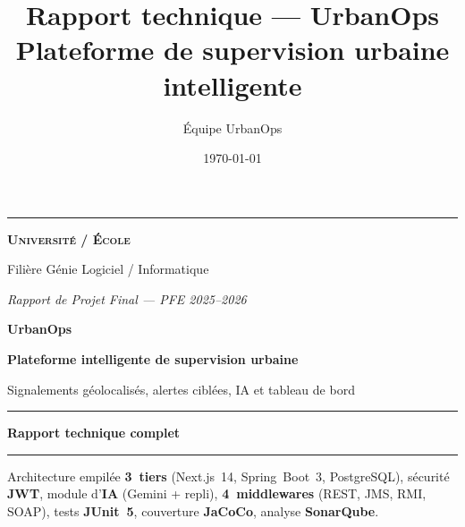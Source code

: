 \documentclass[12pt,a4paper,twoside,openright]{book}
\title{Rapport technique — UrbanOps\\\large Plateforme de supervision urbaine intelligente}
\author{Équipe UrbanOps}
\date{\today}
\begin{document}
\begin{titlepage}
  \thispagestyle{empty}
  \centering
  \null\vspace*{0.8cm}

  {\color{AlertRed}\rule{0.82\textwidth}{2.2pt}}\par\vspace{0.75cm}

  {\Large\bfseries\textsc{Université / École}}\par\vspace{0.2cm}
  {\large Filière Génie Logiciel / Informatique}\par\vspace{0.35cm}
  {\normalsize\itshape Rapport de Projet Final — PFE 2025–2026}\par\vspace{1.6cm}

  {\Huge\bfseries\color{UrbanBlue} UrbanOps}\par\vspace{0.45cm}
  {\LARGE\bfseries Plateforme intelligente de supervision urbaine}\par\vspace{0.25cm}
  {\large Signalements géolocalisés, alertes ciblées, IA et tableau de bord}\par\vspace{1.4cm}

  {\color{AlertRed}\rule{0.55\textwidth}{0.55pt}}\par\vspace{0.65cm}
  {\LARGE\bfseries Rapport technique complet}\par\vspace{0.55cm}
  {\color{AlertRed}\rule{0.55\textwidth}{0.55pt}}\par\vspace{1.6cm}

  \begin{minipage}{0.88\textwidth}\centering
    \color{UrbanGray}\large
    Architecture empilée \textbf{3~tiers} (Next.js~14, Spring~Boot~3, PostgreSQL), sécurité \textbf{JWT}, module d'\textbf{IA} (Gemini + repli), \textbf{4~middlewares} (REST, JMS, RMI, SOAP), tests \textbf{JUnit~5}, couverture \textbf{JaCoCo}, analyse \textbf{SonarQube}.
  \end{minipage}\par\vfill


\end{titlepage}
\end{document}
